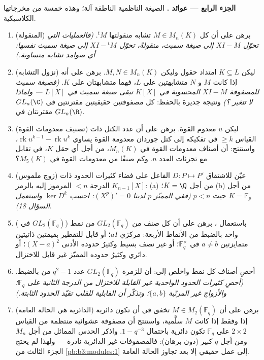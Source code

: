 \begin{problem}
\medskip
\noindent\textbf{الجزء الرابع --- عوائد .} الصيغة
الناظمية الناطقة آلة؛ وهذه خمسة من مخرجاتها الكلاسيكية.
\begin{enumerate}[resume]
  \item (المنقولة) برهن على أن كل $M \in M_n(K)$ تشابه منقولتها
        ${}^tM$. \emph{(فالعمليات التي تحوّل $XI - M$ إلى صيغة
        سميث، منقولةً، تحوّل $XI - {}^tM$ إلى صيغة سميث نفسها:
        أي صوامد تشابه متساوية.)}
  \item (نزول التشابه) ليكن $K \subseteq L$ امتداد حقول وليكن
        $M, N \in M_n(K)$. برهن على أنه إذا كانت $M$ و $N$ متشابهتين على
        $L$، فهما متشابهتان على $K$. \emph{(فصيغة سميث للمصفوفة
        $XI - M$ المحسوبة في $K[X]$ تبقى صيغة سميث في $L[X]$ ---
        ولماذا لا تتغير ؟)} ونتيجة جديرة بالحفظ:
        كل مصفوفتين حقيقيتين مقترنتين في $GL_n(\C)$ مقترنتان في
        $GL_n(\R)$.
  \item (تصنيف معدومات القوة) ليكن $u$ معدوم القوة. برهن على أن
        عدد الكتل ذات القياس $\geq k$ في تفكيكه إلى كتل جوردان
        معدومة القوة يساوي $\operatorname{rk}u^{k-1} - \operatorname{rk}u^k$، واستنتج: أن أصناف معدومات
        القوة في $M_n(K)$، من أجل أي حقل $K$، في تقابل مع تجزئات
        العدد $n$. وكم صنفًا من معدومات القوة في $M_5(K)$؟
  \item (زوج ملموس) عيّن  للاشتقاق $D\colon P \mapsto P'$ الفاعل
        على فضاء كثيرات الحدود ذات الدرجة $< n$ المرموز إليه
        بالرمز $K_{n-1}[X]$: (a) من أجل $K =
        \Q$؛ (b) من أجل $K = \mathbb F_p$
        حيث $p < n$ \emph{(ففي المميّز $p$ لدينا $(X^p)' = 0$:
        احسب $\ker D^k$ واستعمل السؤال 18)}.
  \item ( في $GL_2(\mathbb F_q)$) باستعمال ،
        برهن على أن كل صنف من $GL_2(\mathbb F_q)$ من نمط واحد بالضبط من
        الأنماط الأربعة: مركزي $aI$؛ أو قابل للتقطير بقيمتين
        ذاتيتين متمايزتين $a \neq b$ في $\mathbb F_q^\times$؛ أو غير نصف بسيط
        وكثيرُ حدوده الأدنى $(X - a)^2$؛ أو دائري وكثيرُ حدوده
        المميّز غير قابل للاختزال.
  \item أحصِ أصناف كل نمط واخلص إلى: أن للزمرة $GL_2(\mathbb F_q)$ عدد $q^2 - 1$
        من  بالضبط. \emph{(أحصِ كثيرات الحدود
        الواحدية غير القابلة للاختزال من الدرجة الثانية على
        $\mathbb F_q$؛ والأزواج غير المرتّبة $\{a, b\}$؛ وتذكّر
        أن القابلية للقلب تقيّد الحدود الثابتة.)}
  \item (الدائرية هي الحالة العامة) برهن على أن $M \in M_2(\mathbb F_q)$ تخفق في
        أن تكون دائرية إذا وفقط إذا كانت $M$ سلَّمية، واستنتج أن
        مصفوفة عشوائية منتظمة من القياس $2\times2$ على
        $\mathbb F_q$ تكون دائرية باحتمال $1 - q^{-3}$. واذكر
        الحدس المماثل من أجل $M_n$ ومن أجل $q$ كبير (دون برهان):
        فالمصفوفات غير الدائرية نادرة --- ولهذا لم يحتج الجزء
        الثالث من \cref{pb:b3:modules:1} إلى عمل حقيقي إلا بعد تجاوز الحالة
        العامة.
\end{enumerate}


\end{problem}
